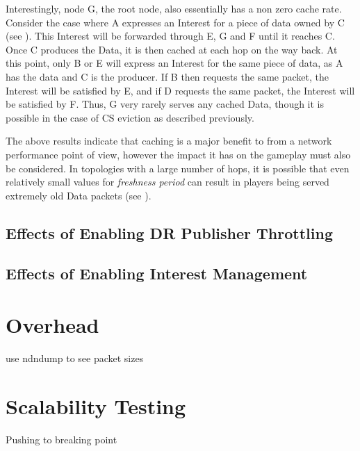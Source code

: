 Interestingly, node G, the root node, also essentially has a non zero cache rate. Consider the case where A expresses an Interest for a piece of data owned by C (see ). This Interest will be forwarded through E, G and F until it reaches C. Once C produces the Data, it is then cached at each hop on the way back. At this point, only B or E will express an Interest for the same piece of data, as A has the data and C is the producer. If B then requests the same packet, the Interest will be satisfied by E, and if D requests the same packet, the Interest will be satisfied by F. Thus, G very rarely serves any cached Data, though it is possible in the case of CS eviction as described previously. 

The above results indicate that caching is a major benefit to \game{} from a network performance point of view, however the impact it has on the gameplay must also be considered. In topologies with a large number of hops, it is possible that even relatively small values for \textit{freshness period} can result in players being served extremely old Data packets (see ).


\subsection{Effects of Enabling DR Publisher Throttling}


\subsection{Effects of Enabling Interest Management}

\section{Overhead}
use ndndump to see packet sizes

\section{Scalability Testing}\label{sec:eval:scalability}
Pushing to breaking point